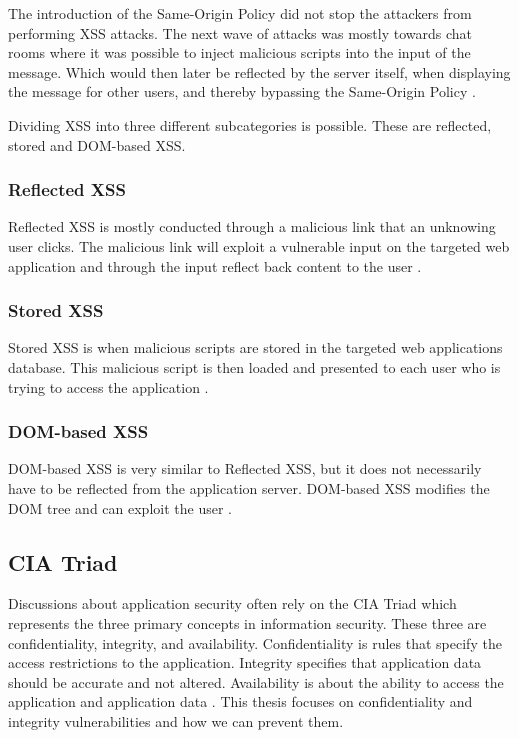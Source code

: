 The introduction of the Same-Origin Policy did not stop the attackers from performing XSS attacks. The next wave of attacks was mostly towards chat rooms where it was possible to inject malicious scripts into the input of the message. Which would then later be reflected by the server itself, when displaying the message for other users, and thereby bypassing the Same-Origin Policy \parencite{FogieSeth2007Xacs}.

Dividing XSS into three different subcategories is possible. These are reflected, stored and DOM-based XSS.



\subsubsection{Reflected XSS}
Reflected XSS is mostly conducted through a malicious link that an unknowing user clicks. The malicious link will exploit a vulnerable input on the targeted web application and through the input reflect back content to the user \parencite{Secure_Web}.



\subsubsection{Stored XSS}
Stored XSS is when malicious scripts are stored in the targeted web applications database. This malicious script is then loaded and presented to each user who is trying to access the application \parencite{Secure_Web}.



\subsubsection{DOM-based XSS}
DOM-based XSS is very similar to Reflected XSS, but it does not necessarily have to be reflected from the application server. DOM-based XSS modifies the DOM tree and can exploit the user \parencite{Secure_Web}.



\subsection{CIA Triad}
Discussions about application security often rely on the CIA Triad which represents the three primary concepts in information security. These three are confidentiality, integrity, and availability. Confidentiality is rules that specify the access restrictions to the application. Integrity specifies that application data should be accurate and not altered. Availability is about the ability to access the application and application data \parencite{2014C1-W}. This thesis focuses on confidentiality and integrity vulnerabilities and how we can prevent them.

